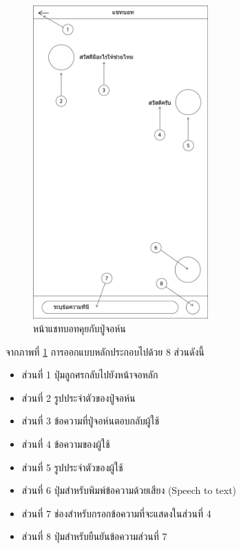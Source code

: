 		\begin{figure}[H]
			\centering
			\includegraphics[width=0.6\textwidth]{Figures/3/UI/chatbot}
			\caption{หน้าแชทบอทคุยกับปู่จอห์น}
			\label{Fig:แชทบอท}
		\end{figure}
		จากภาพที่ \ref{Fig:แชทบอท} การออกแบบหลักประกอบไปด้วย 8 ส่วนดังนี้
		\begin{itemize}
			\item ส่วนที่ 1 ปุ่มลูกศรกลับไปยังหน้าจอหลัก
			\item ส่วนที่ 2 รูปประจำตัวของปู่จอห์น
			\item ส่วนที่ 3 ข้อความที่ปู่จอห์นตอบกลับผู้ใช้
			\item ส่วนที่ 4 ข้อความของผู้ใช้
			\item ส่วนที่ 5 รูปประจำตัวของผู้ใช้
			\item ส่วนที่ 6 ปุ่มสำหรับพิมพ์ข้อความด้วยเสียง (Speech to text)
			\item ส่วนที่ 7 ช่องสำหรับกรอกข้อความที่จะแสดงในส่วนที่ 4
			\item ส่วนที่ 8 ปุ่มสำหรับยืนยันข้อความส่วนที่ 7
		\end{itemize}

